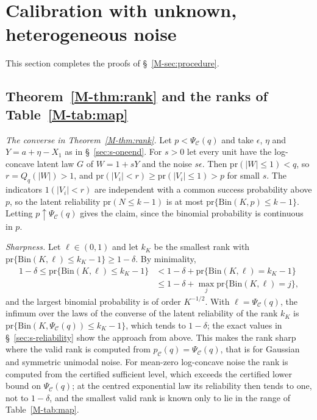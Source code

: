 \documentclass[12pt]{article}
\renewcommand{\_}{\usc\allowbreak}
\theoremstyle{definition}
\numberwithin{equation}{section}
\newcommand{\pr}{\mathrm{pr}}
\newcommand{\E}{\mathcal{C}}
\newcommand{\Bin}{\mathrm{Bin}}
\begin{document}
\section{Calibration with unknown, heterogeneous noise}\label{sec:s-calib}

This section completes the proofs of \S~\ref{M-sec:procedure}.

\subsection{Theorem~\ref{M-thm:rank} and the ranks of Table~\ref{M-tab:map}}\label{sec:s-rank}

\emph{The converse in Theorem~\ref{M-thm:rank}.} Let $p < \Psi_{\E}(q)$ and take $\epsilon$, $\eta$ and $Y = a + \eta - X_1$ as in \S~\ref{sec:s-oneend}. For $s > 0$ let every unit have the log-concave latent law $G$ of $W = 1 + sY$ and the noise $s\epsilon$. Then $\pr(|W| \le 1) < q$, so $r = Q_q(|W|) > 1$, and $\pr(|V_i| < r) \ge \pr(|V_i| \le 1) > p$ for small $s$. The indicators $1(|V_i| < r)$ are independent with a common success probability above $p$, so the latent reliability $\pr(N \le k - 1)$ is at most $\pr\{\Bin(K, p) \le k - 1\}$. Letting $p \uparrow \Psi_{\E}(q)$ gives the claim, since the binomial probability is continuous in $p$.

\emph{Sharpness.} Let $\ell \in (0, 1)$ and let $k_K$ be the smallest rank with $\pr\{\Bin(K, \ell) \le k_K - 1\} \ge 1 - \delta$. By minimality,
\begin{align*}
1 - \delta \le \pr\{\Bin(K, \ell) \le k_K - 1\} &< 1 - \delta + \pr\{\Bin(K, \ell) = k_K - 1\} \\
&\le 1 - \delta + \max_j\pr\{\Bin(K, \ell) = j\},
\end{align*}
and the largest binomial probability is of order $K^{-1/2}$. With $\ell = \Psi_{\E}(q)$, the infimum over the laws of the converse of the latent reliability of the rank $k_K$ is $\pr\{\Bin(K, \Psi_{\E}(q)) \le k_K - 1\}$, which tends to $1 - \delta$; the exact values in \S~\ref{sec:s-reliability} show the approach from above. This makes the rank sharp where the valid rank is computed from $p_{\E}(q) = \Psi_{\E}(q)$, that is for Gaussian and symmetric unimodal noise. For mean-zero log-concave noise the rank is computed from the certified sufficient level, which exceeds the certified lower bound on $\Psi_{\E}(q)$; at the centred exponential law its reliability then tends to one, not to $1 - \delta$, and the smallest valid rank is known only to lie in the range of Table~\ref{M-tab:map}.
\end{document}
